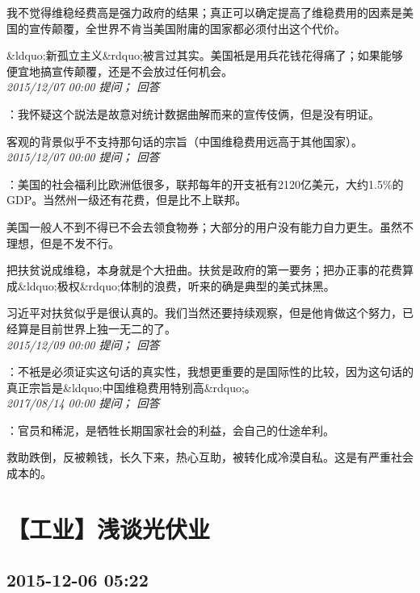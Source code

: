 \documentclass[twocolumn]{ctexart}
\begin{document}
我不觉得维稳经费高是强力政府的结果；真正可以确定提高了维稳费用的因素是美国的宣传颠覆，全世界不肯当美国附庸的国家都必须付出这个代价。

\&ldquo;新孤立主义\&rdquo;被言过其实。美国衹是用兵花钱花得痛了；如果能够便宜地搞宣传颠覆，还是不会放过任何机会。\\

\textit{\hfill\noindent\small 2015/12/07 00:00 提问； 回答}

：我怀疑这个説法是故意对统计数据曲解而来的宣传伎俩，但是没有明证。

客观的背景似乎不支持那句话的宗旨（中国维稳费用远高于其他国家）。\\

\textit{\hfill\noindent\small 2015/12/07 00:00 提问； 回答}

：美国的社会福利比欧洲低很多，联邦每年的开支衹有2120亿美元，大约1.5\%的GDP。当然州一级还有花费，但是比不上联邦。

美国一般人不到不得已不会去领食物券；大部分的用户没有能力自力更生。虽然不理想，但是不发不行。

把扶贫说成维稳，本身就是个大扭曲。扶贫是政府的第一要务；把办正事的花费算成\&ldquo;极权\&rdquo;体制的浪费，听来的确是典型的美式抹黑。

习近平对扶贫似乎是很认真的。我们当然还要持续观察，但是他肯做这个努力，已经算是目前世界上独一无二的了。\\

\textit{\hfill\noindent\small 2015/12/09 00:00 提问； 回答}

：不衹是必须证实这句话的真实性，我想更重要的是国际性的比较，因为这句话的真正宗旨是\&ldquo;中国维稳费用特别高\&rdquo;。\\

\textit{\hfill\noindent\small 2017/08/14 00:00 提问； 回答}

：官员和稀泥，是牺牲长期国家社会的利益，会自己的仕途牟利。

救助跌倒，反被赖钱，长久下来，热心互助，被转化成冷漠自私。这是有严重社会成本的。\\


\section{【工业】浅谈光伏业}
\subsection{2015-12-06 05:22}
\end{document}
